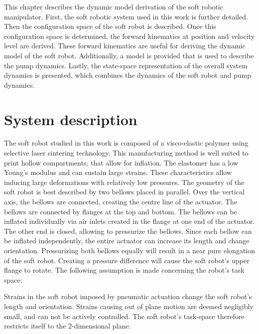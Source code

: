 \label{chap2}

This chapter describes the dynamic model derivation of the soft robotic manipulator. First, the soft robotic system used in this work is further detailed. Then the configuration space of the soft robot is described. Once this configuration space is determined, the forward kinematics at position and velocity level are derived. These forward kinematics are useful for deriving the dynamic model of the soft robot. Additionally, a model is provided that is used to describe the pump dynamics. Lastly, the state-space representation of the overall system dynamics is presented, which combines the dynamics of the soft robot and pump dynamics.



\section{System description}

The soft robot studied in this work is composed of a visco-elastic polymer using selective laser sintering technology. This manufacturing method is well suited to print hollow compartments, that allow for inflation. The elastomer has a low Young's modulus and can sustain large strains. These characteristics allow inducing large deformations with relatively low pressures. The geometry of the soft robot is best described by two bellows placed in parallel. Over the vertical axis, the bellows are connected, creating the centre line of the actuator. The bellows are connected by flanges at the top and bottom. The bellows can be inflated individually via air inlets created in the flange at one end of the actuator. The other end is closed, allowing to pressurize the bellows. Since each bellow can be inflated independently, the entire actuator can increase its length and change orientation. Pressurizing both bellows equally will result in a near pure elongation of the soft robot. Creating a pressure difference will cause the soft robot's upper flange to rotate. The following assumption is made concerning the robot's task space:

\begin{theorem}
Strains in the soft robot imposed by pneumatic actuation change the soft robot's length and orientation. Strains causing out of plane motion are deemed negligibly small, and can not be actively controlled. The soft robot's task-space therefore restricts itself to the 2-dimensional plane.
\end{theorem}

